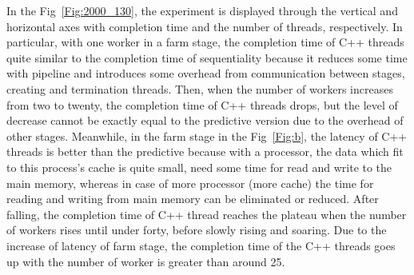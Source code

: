 \documentclass[runningheads,a4paper]{llncs}
\begin{document}
In the Fig~\ref{Fig:2000_130}, the experiment is displayed through the vertical and horizontal axes with completion time and the number of threads, respectively.
In particular, with one worker in a farm stage, the completion time of C++ threads quite similar to the completion time of sequentiality because it reduces some time with pipeline and introduces some overhead from communication between stages, creating and termination threads. Then, when the number of workers increases from two to twenty, the completion time of C++ threads drops, but the level of decrease cannot be exactly equal to the predictive version due to the overhead of other stages. Meanwhile, in the farm stage in the Fig~\ref{Fig:b}, the latency of C++ threads is better than the predictive because with a processor, the data which fit to this process's cache is quite small, need some time for read and write to the main memory, whereas in case of more processor (more cache) the time for reading and writing from main memory can be eliminated or reduced.
After falling, the completion time of C++ thread reaches the plateau when the number of workers rises until under forty, before slowly rising and soaring. Due to the increase of latency of farm stage, the completion time of the C++ threads goes up with the number of worker is greater than around 25.
\end{document}
